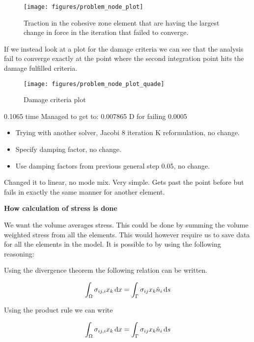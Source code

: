 \documentclass[convergence.tex]{subfiles}
\begin{document}
\begin{figure}[ht]
\centering
\texttt{[image: figures/problem\_node\_plot]}
\caption{Traction in the cohesive zone element that are having the largest change in force in the iteration that failed to converge.}
\label{fig:prob_node_plot}
\end{figure}

If we instead look at a plot for the damage criteria we can see that the analysis fail to converge exactly at the point where the second integration point hits the damage fulfilled criteria.

\begin{figure}[ht]
\centering
\texttt{[image: figures/problem\_node\_plot\_quade]}
\caption{Damage criteria plot}
\label{fig:prob_node_plot}
\end{figure}

0.1065 time
Managed to get to: 0.007865 D for failing 0.0005

\begin{itemize}
\item Trying with another solver, Jacobi 8 iteration K reformulation, no change.
\item Specify damping factor, no change.
\item Use damping factors from previous general step 0.05, no change.
\end{itemize}

 
 
 Changed it to linear, no mode mix. Very simple. Gets past the point before but fails in exactly the same manner for another element.
 
 
\newpage
\textbf{How calculation of stress is done}

We want the volume averages stress. This could be done by summing the volume weighted stress from all the elements. This would however require us to save data for all the elements in the model. It is possible to by using the following reasoning:

Using the divergence theorem the following relation can be written.

\begin{equation}
\int_\Omega \sigma_{ij,i} x_k \, \mathrm{d} x = \int_\Gamma \sigma_{ij}  x_k \hat{n}_i \, \mathrm{d} s
\end{equation}

Using the product rule we can write

\begin{equation}
\int_\Omega \sigma_{ij,i} x_k \, \mathrm{d} x = \int_\Gamma \sigma_{ij}  x_k \hat{n}_i \, \mathrm{d} s
\end{equation}
\end{document}
